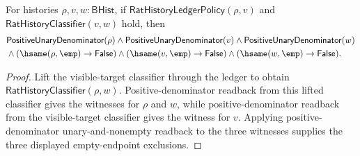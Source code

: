\begin{theorem}
\label{thm:rat-ledger-visible-target-positive-nonempty-package}
For histories $\rho,v,w:\mathsf{BHist}$, if
$\mathsf{RatHistoryLedgerPolicy}(\rho,v)$ and
$\mathsf{RatHistoryClassifier}(v,w)$ hold, then
$$
\begin{aligned}
&\mathsf{PositiveUnaryDenominator}(\rho)\land
\mathsf{PositiveUnaryDenominator}(v)\land
\mathsf{PositiveUnaryDenominator}(w)\\
&{}\land(\hsame(\rho,\emp)\to\mathsf{False})
\land(\hsame(v,\emp)\to\mathsf{False})
\land(\hsame(w,\emp)\to\mathsf{False}).
\end{aligned}
$$
\end{theorem}
\begin{proof}
Lift the visible-target classifier through the ledger to obtain
$\mathsf{RatHistoryClassifier}(\rho,w)$. Positive-denominator readback from
this lifted classifier gives the witnesses for $\rho$ and $w$, while
positive-denominator readback from the visible-target classifier gives the
witness for $v$. Applying positive-denominator unary-and-nonempty readback to
the three witnesses supplies the three displayed empty-endpoint exclusions.
\end{proof}

